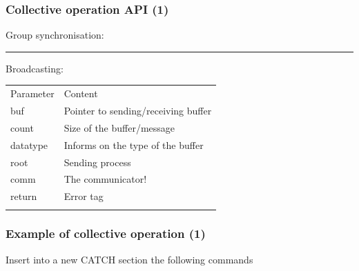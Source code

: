 \subsubsection{Collective operation API
(1)}\label{collective-operation-api-1}

Group synchronisation:

\begin{Shaded}
\begin{Highlighting}[]
 
\end{Highlighting}
\end{Shaded}

\begin{center}\rule{3in}{0.4pt}\end{center}

Broadcasting:

\begin{Shaded}
\begin{Highlighting}[]
    
\end{Highlighting}
\end{Shaded}

\begin{longtable}[c]{@{}ll@{}}
\toprule\addlinespace
Parameter & Content
\\\addlinespace
\midrule\endhead
buf & Pointer to sending/receiving buffer
\\\addlinespace
count & Size of the buffer/message
\\\addlinespace
datatype & Informs on the type of the buffer
\\\addlinespace
root & Sending process
\\\addlinespace
comm & The communicator!
\\\addlinespace
return & Error tag
\\\addlinespace
\bottomrule
\end{longtable}

\subsubsection{Example of collective operation
(1)}\label{example-of-collective-operation-1}

Insert into a new CATCH section the following commands

